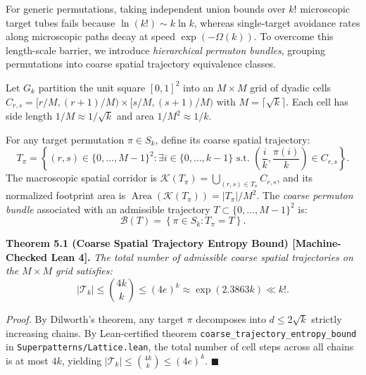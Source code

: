 \documentclass[
  11pt,
]{article}
\begin{document}
For generic permutations, taking independent union bounds over $k!$ microscopic target tubes fails because $\ln(k!) \sim k \ln k$, whereas single-target avoidance rates along microscopic paths decay at speed $\exp(-\Omega(k))$. To overcome this length-scale barrier, we introduce \emph{hierarchical permuton bundles}, grouping permutations into coarse spatial trajectory equivalence classes.

Let $G_k$ partition the unit square $[0, 1]^2$ into an $M \times M$ grid of dyadic cells $C_{r, s} = [r/M, (r+1)/M) \times [s/M, (s+1)/M)$ with $M = \lceil\sqrt{k}\rceil$. Each cell has side length $1/M \approx 1/\sqrt{k}$ and area $1/M^2 \approx 1/k$.

For any target permutation $\pi \in S_k$, define its coarse spatial trajectory:
\begin{equation}
T_\pi = \left\{ (r, s) \in \{0, \dots, M-1\}^2 : \exists i \in \{0, \dots, k-1\} \text{ s.t. } \left(\frac{i}{k}, \frac{\pi(i)}{k}\right) \in C_{r, s} \right\}.
\end{equation}
The macroscopic spatial corridor is $\mathcal{K}(T_\pi) = \bigcup_{(r, s) \in T_\pi} C_{r, s}$, and its normalized footprint area is $\operatorname{Area}(\mathcal{K}(T_\pi)) = |T_\pi| / M^2$. The \emph{coarse permuton bundle} associated with an admissible trajectory $T \subset \{0, \dots, M-1\}^2$ is:
\begin{equation}
\mathcal{B}(T) = \left\{ \pi \in S_k : T_\pi = T \right\}.
\end{equation}

\textbf{Theorem 5.1 (Coarse Spatial Trajectory Entropy Bound) [Machine-Checked Lean 4].}
\emph{The total number of admissible coarse spatial trajectories on the $M \times M$ grid satisfies:}
\begin{equation}
|\mathcal{T}_k| \le \binom{4k}{k} \le (4e)^k \approx \exp(2.3863 k) \ll k!.
\end{equation}

\emph{Proof.}
By Dilworth's theorem, any target $\pi$ decomposes into $d \le 2\sqrt{k}$ strictly increasing chains. By Lean-certified theorem \texttt{coarse\_trajectory\_entropy\_bound} in \texttt{Superpatterns/Lattice.lean}, the total number of cell steps across all chains is at most $4k$, yielding $|\mathcal{T}_k| \le \binom{4k}{k} \le (4e)^k$. $\blacksquare$
\end{document}
